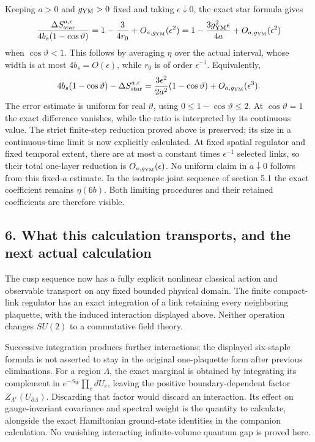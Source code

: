 \documentclass[
  11pt,
]{article}
\begin{document}
Keeping \(a>0\) and \(g_{\rm YM}>0\) fixed and taking
\(\epsilon\downarrow0\), the exact star formula gives \[
 \frac{\Delta S^{a,\epsilon}_{\rm star}}
      {4b_s(1-\cos\vartheta)}
 =1-\frac{3}{4r_0}+O_{a,g_{\rm YM}}(\epsilon^2)
 =1-\frac{3g_{\rm YM}^2\epsilon}{4a}
       +O_{a,g_{\rm YM}}(\epsilon^2)
\] when \(\cos\vartheta<1\). This follows by averaging \(\eta\) over the
actual interval, whose width is at most \(4b_s=O(\epsilon)\), while
\(r_0\) is of order \(\epsilon^{-1}\). Equivalently, \[
 4b_s(1-\cos\vartheta)-\Delta S^{a,\epsilon}_{\rm star}
 =\frac{3\epsilon^2}{2a^2}(1-\cos\vartheta)
      +O_{a,g_{\rm YM}}(\epsilon^3).
\] The error estimate is uniform for real \(\vartheta\), using
\(0\leq1-\cos\vartheta\leq2\). At \(\cos\vartheta=1\) the exact
difference vanishes, while the ratio is interpreted by its continuous
value. The strict finite-step reduction proved above is preserved; its
size in a continuous-time limit is now explicitly calculated. At fixed
spatial regulator and fixed temporal extent, there are at most a
constant times \(\epsilon^{-1}\) selected links, so their total
one-layer reduction is \(O_{a,g_{\rm YM}}(\epsilon)\). No uniform claim
in \(a\downarrow0\) follows from this fixed-\(a\) estimate. In the
isotropic joint sequence of section 5.1 the exact coefficient remains
\(\eta(6b)\). Both limiting procedures and their retained coefficients
are therefore visible.

\subsection{6. What this calculation transports, and the next actual
calculation}\label{what-this-calculation-transports-and-the-next-actual-calculation}

The cusp sequence now has a fully explicit nonlinear classical action
and observable transport on any fixed bounded physical domain. The
finite compact-link regulator has an exact integration of a link
retaining every neighboring plaquette, with the induced interaction
displayed above. Neither operation changes \(SU(2)\) to a commutative
field theory.

Successive integration produces further interactions; the displayed
six-staple formula is not asserted to stay in the original one-plaquette
form after previous eliminations. For a region \(\Lambda\), the exact
marginal is obtained by integrating its complement in
\(e^{-S_W}\prod_e dU_e\), leaving the positive boundary-dependent factor
\(Z_{\Lambda^c}(U_{\partial\Lambda})\). Discarding that factor would
discard an interaction. Its effect on gauge-invariant covariance and
spectral weight is the quantity to calculate, alongside the exact
Hamiltonian ground-state identities in the companion calculation. No
vanishing interacting infinite-volume quantum gap is proved here.
\end{document}
